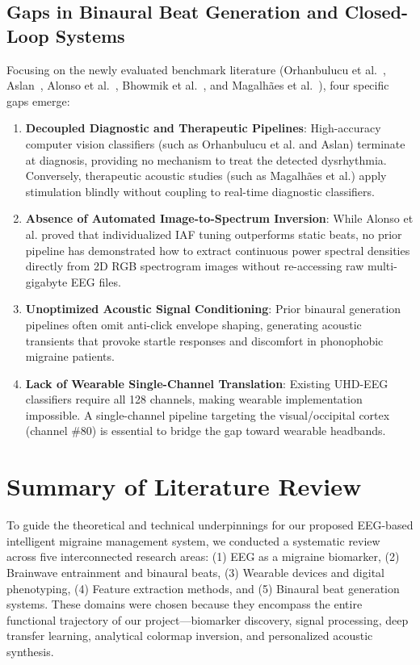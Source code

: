 \documentclass[12pt, a4paper]{report}
\begin{document}
\subsection{Gaps in Binaural Beat Generation and Closed-Loop Systems}
Focusing on the newly evaluated benchmark literature (Orhanbulucu et al.~\cite{orhanbulucu2023hybrid}, Aslan~\cite{aslan2023migrainecnn}, Alonso et al.~\cite{alonso2024individualized}, Bhowmik et al.~\cite{bhowmik2024carrier}, and Magalh\~aes et al.~\cite{magalhaes2025auditory}), four specific gaps emerge:
\begin{enumerate}
    \item \textbf{Decoupled Diagnostic and Therapeutic Pipelines}: High-accuracy computer vision classifiers (such as Orhanbulucu et al. and Aslan) terminate at diagnosis, providing no mechanism to treat the detected dysrhythmia. Conversely, therapeutic acoustic studies (such as Magalh\~aes et al.) apply stimulation blindly without coupling to real-time diagnostic classifiers.
    \item \textbf{Absence of Automated Image-to-Spectrum Inversion}: While Alonso et al. proved that individualized IAF tuning outperforms static beats, no prior pipeline has demonstrated how to extract continuous power spectral densities directly from 2D RGB spectrogram images without re-accessing raw multi-gigabyte EEG files.
    \item \textbf{Unoptimized Acoustic Signal Conditioning}: Prior binaural generation pipelines often omit anti-click envelope shaping, generating acoustic transients that provoke startle responses and discomfort in phonophobic migraine patients.
    \item \textbf{Lack of Wearable Single-Channel Translation}: Existing UHD-EEG classifiers require all 128 channels, making wearable implementation impossible. A single-channel pipeline targeting the visual/occipital cortex (channel \#80) is essential to bridge the gap toward wearable headbands.
\end{enumerate}

\section{Summary of Literature Review}
\label{sec:literature_summary}
To guide the theoretical and technical underpinnings for our proposed EEG-based intelligent migraine management system, we conducted a systematic review across five interconnected research areas: (1) EEG as a migraine biomarker, (2) Brainwave entrainment and binaural beats, (3) Wearable devices and digital phenotyping, (4) Feature extraction methods, and (5) Binaural beat generation systems. These domains were chosen because they encompass the entire functional trajectory of our project---biomarker discovery, signal processing, deep transfer learning, analytical colormap inversion, and personalized acoustic synthesis.
\end{document}
